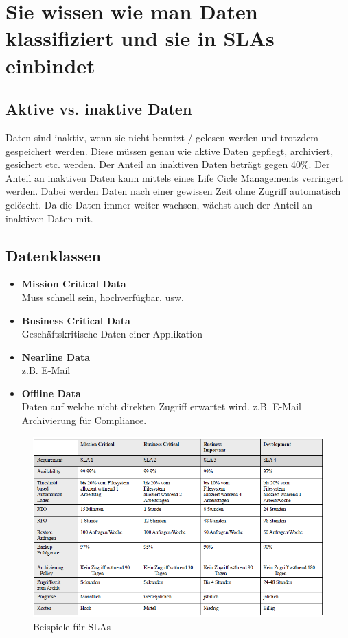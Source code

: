 \section{Sie wissen wie man Daten klassifiziert und sie in SLAs einbindet}
\subsection{Aktive vs. inaktive Daten}
Daten sind inaktiv, wenn sie nicht benutzt / gelesen werden und trotzdem gespeichert werden. Diese müssen genau wie aktive Daten gepflegt, archiviert, gesichert etc. werden.
Der Anteil an inaktiven Daten beträgt gegen 40\%. Der Anteil an inaktiven Daten kann mittels eines Life Cicle Managements verringert werden. Dabei werden Daten nach einer gewissen Zeit ohne Zugriff automatisch gelöscht. Da die Daten immer weiter wachsen, wächst auch der Anteil an inaktiven Daten mit.
\subsection{Datenklassen}
\begin{itemize}
	\item \textbf{Mission Critical Data} \\
	Muss schnell sein, hochverfügbar, usw.
	\item \textbf{Business Critical Data} \\
	Geschäftskritische Daten einer Applikation
	\item \textbf{Nearline Data} \\
	z.B. E-Mail
	\item \textbf{Offline Data} \\
	Daten auf welche nicht direkten Zugriff erwartet wird. z.B. E-Mail Archivierung für Compliance.
\end{itemize}
\begin{figure}
	\centering
	\includegraphics[width=0.9\linewidth]{fig/sla}
	\caption{Beispiele für SLAs}
	\label{fig:sla_beispiele}
\end{figure}
